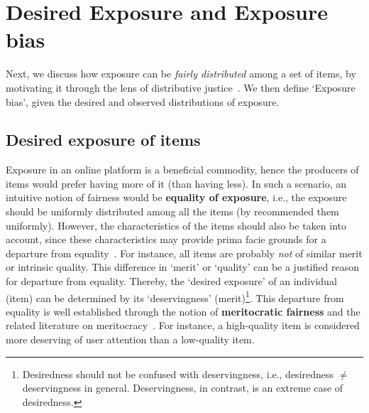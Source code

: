 \section{Desired Exposure and Exposure bias}
Next, we discuss how exposure can be %
{\it fairly distributed} among a set of items, by motivating it through the lens of distributive justice~\cite{yaari1984dividing}. We %
then define `Exposure bias', given the desired and observed distributions of exposure. 

\vspace{-2 mm}
\subsection{Desired exposure of items}
\label{sec:desired}
Exposure in an online platform is a beneficial commodity, %
hence the producers of items would prefer having more of it (than having less). In such a scenario, an intuitive notion of  fairness would be \textbf{equality of exposure}, i.e., the exposure should be uniformly distributed among all the items (by recommended them uniformly). 
However, the characteristics of the %
items %
should also be taken into account, since these characteristics may provide prima facie grounds for a departure from equality~\cite{yaari1984dividing}. 
For instance, all items are probably {\it not} of similar merit or intrinsic quality. This difference in `merit' or `quality' can be a justified reason for departure from equality. Thereby, the `desired exposure' of an individual (item) can be determined by its `deservingness' (merit)\footnote{Desiredness should not be confused with deservingness, i.e., desiredness $\ne$ deservingness in general. Deservingness, in contrast, is an extreme case of desiredness.}. This departure from equality is well established through the notion of \textbf{meritocratic fairness} and the related literature on meritocracy~\cite{joseph2018meritocratic,joseph2016fairness}. For instance, a high-quality item is considered more deserving of %
user attention than a low-quality item. 

